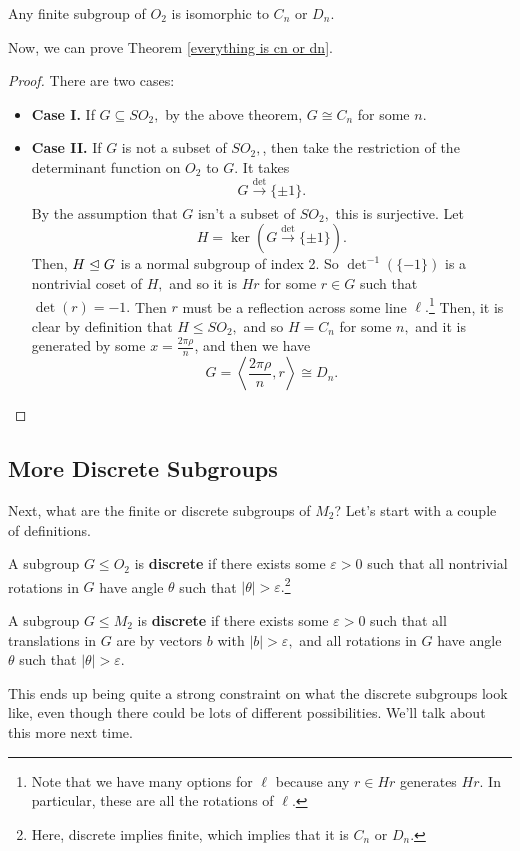 \begin{theorem}\label{everything is cn or dn}
Any finite subgroup of $O_2$ is isomorphic to $C_n$ or $D_n.$ 
\end{theorem}
Now, we can prove Theorem \ref{everything is cn or dn}. 
\begin{proof}
There are two cases:
\begin{itemize}
    \item \textbf{Case I.} If $G \subseteq SO_2,$ by the above theorem, $G \cong C_n$ for some $n.$
    \item \textbf{Case II.} If $G$ is not a subset of $SO_2,$, then take the restriction of the determinant function on $O_2$ to $G.$ It takes \[G \xrightarrow[]{\det}\{\pm 1\}.\] By the assumption that $G$ isn't a subset of $SO_2,$ this is surjective. Let 
    \[
    H = \ker(G \xrightarrow[]{\det}\{\pm 1\}).
    \]
    Then, $H \trianglelefteq G$ is a normal subgroup of index 2. So $\det^{-1}(\{-1\})$ is a nontrivial coset of $H,$ and so it is $Hr$ for some $r \in G$ such that $\det(r) = -1.$ Then $r$ must be a reflection across some line $\ell.$\footnote{Note that we have many options for $\ell$ because any $r\in Hr$ generates $Hr$. In particular, these are all the rotations of $\ell$.} Then, it is clear by definition that $H \leq SO_2,$ and so $H = C_n$ for some $n,$ and it is generated by some $x = \frac{2\pi \rho}{n}$, and then we have 
    \[
    G = \left \langle \frac{2\pi\rho}{n}, r\right \rangle \cong D_n.
    \]
\end{itemize}
\end{proof}

\subsection{More Discrete Subgroups}
Next, what are the finite or discrete subgroups of $M_2$? Let's start with a couple of definitions. 

\begin{definition}
A subgroup $G \leq O_2$ is \textbf{discrete} if there exists some $\varepsilon > 0$ such that all nontrivial rotations in $G$ have angle $\theta$ such that $|\theta| > \varepsilon.$\footnote{Here, discrete implies finite, which implies that it is $C_n$ or $D_n.$}
\end{definition}

\begin{definition}
A subgroup $G \leq M_2$ is \textbf{discrete} if there exists some $\varepsilon > 0$ such that all translations in $G$ are by vectors $b$ with $|b| > \varepsilon,$ and all rotations in $G$ have angle $\theta$ such that $|\theta| > \varepsilon.$
\end{definition}

This ends up being quite a strong constraint on what the discrete subgroups look like, even though there could be lots of different possibilities. We'll talk about this more next time.

\newpage